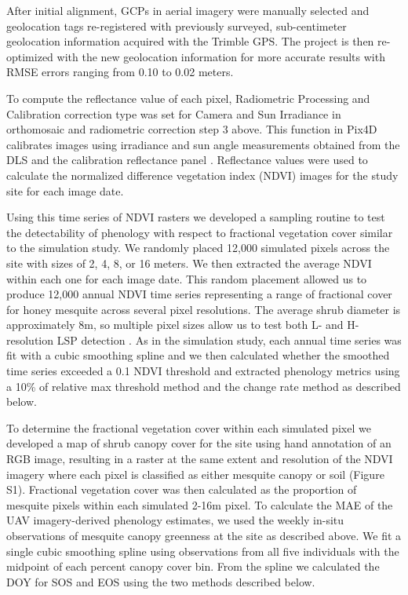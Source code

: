 \documentclass{article}
\begin{document}
After initial alignment, GCPs in aerial imagery were manually selected and geolocation tags re-registered with previously surveyed, sub-centimeter geolocation information acquired with the Trimble GPS. The project is then re-optimized with the new geolocation information for more accurate results with RMSE errors ranging from 0.10 to 0.02 meters.

To compute the reflectance value of each pixel, Radiometric Processing and Calibration correction type was set for Camera and Sun Irradiance in orthomosaic and radiometric correction step 3 above. This function in Pix4D calibrates images using irradiance and sun angle measurements obtained from the DLS and the calibration reflectance panel \cite{cao2019}. Reflectance values were used to calculate the normalized difference vegetation index (NDVI) images for the study site for each image date. 

Using this time series of NDVI rasters we developed a sampling routine to test the detectability of phenology with respect to fractional vegetation cover similar to the simulation study. We randomly placed 12,000 simulated pixels across the site with sizes of 2, 4, 8, or 16 meters. We then extracted the average NDVI within each one for each image date. This random placement allowed us to produce 12,000 annual NDVI time series representing a range of fractional cover for honey mesquite across several pixel resolutions. The average shrub diameter is approximately 8m, so multiple pixel sizes allow us to test both L- and H-resolution LSP detection \cite{strahler1986}. As in the simulation study, each annual time series was fit with a cubic smoothing spline and we then calculated whether the smoothed time series exceeded a 0.1 NDVI threshold and extracted phenology metrics using a 10\% of relative max threshold method and the change rate method as described below. 

To determine the fractional vegetation cover within each simulated pixel we developed a map of shrub canopy cover for the site using hand annotation of an RGB image, resulting in a raster at the same extent and resolution of the NDVI imagery where each pixel is classified as either mesquite canopy or soil (Figure S1). Fractional vegetation cover was then calculated as the proportion of mesquite pixels within each simulated 2-16m pixel. To calculate the MAE of the UAV imagery-derived phenology estimates, we used the weekly in-situ observations of mesquite canopy greenness at the site as described above. We fit a single cubic smoothing spline using observations from all five individuals with the midpoint of each percent canopy cover bin. From the spline we calculated the DOY for SOS and EOS using the two methods described below. 
\end{document}
